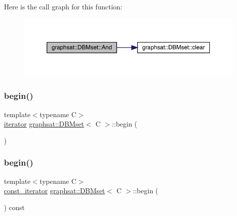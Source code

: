 Here is the call graph for this function\+:\nopagebreak
\begin{figure}[H]
\begin{center}
\leavevmode
\includegraphics[width=350pt]{classgraphsat_1_1_d_b_mset_a22765f57ebbe732d3e8cc55e1f6a83c0_cgraph}
\end{center}
\end{figure}
\mbox{\label{classgraphsat_1_1_d_b_mset_a7aff13f25e4f4f43ceb9e07df6aea276}} 
\subsubsection{\texorpdfstring{begin()}{begin()}\hspace{0.1cm}{\footnotesize\ttfamily [1/2]}}
{\footnotesize\ttfamily template$<$typename C$>$ \\
\mbox{\hyperlink{classgraphsat_1_1_d_b_mset_1_1iterator}{iterator}} \mbox{\hyperlink{classgraphsat_1_1_d_b_mset}{graphsat\+::\+D\+B\+Mset}}$<$ C $>$\+::begin (\begin{DoxyParamCaption}{ }\end{DoxyParamCaption})\hspace{0.3cm}{\ttfamily [inline]}}

\mbox{\label{classgraphsat_1_1_d_b_mset_ac44e4e340d856eeabf26056092520e36}} 
\subsubsection{\texorpdfstring{begin()}{begin()}\hspace{0.1cm}{\footnotesize\ttfamily [2/2]}}
{\footnotesize\ttfamily template$<$typename C$>$ \\
\mbox{\hyperlink{classgraphsat_1_1_d_b_mset_1_1const__iterator}{const\+\_\+iterator}} \mbox{\hyperlink{classgraphsat_1_1_d_b_mset}{graphsat\+::\+D\+B\+Mset}}$<$ C $>$\+::begin (\begin{DoxyParamCaption}{ }\end{DoxyParamCaption}) const\hspace{0.3cm}{\ttfamily [inline]}}

